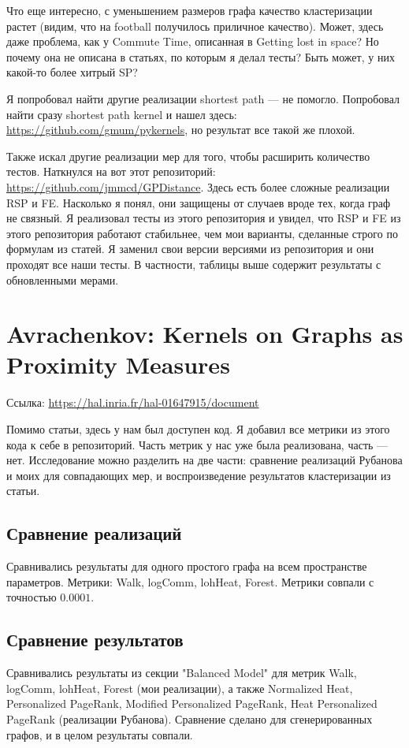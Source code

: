 \documentclass{article}
\begin{document}
 Что еще интересно, с уменьшением размеров графа качество кластеризации растет (видим, что на football получилось приличное качество). Может, здесь даже проблема, как у Commute Time, описанная в Getting lost in space? Но почему она не описана в статьях, по которым я делал тесты? Быть может, у них какой-то более хитрый SP?

Я попробовал найти другие реализации shortest path --- не помогло. Попробовал найти сразу shortest path kernel и нашел здесь: \url{https://github.com/gmum/pykernels}, но результат все такой же плохой.

Также искал другие реализации мер для того, чтобы расширить количество тестов. Наткнулся на вот этот репозиторий: \url{https://github.com/jmmcd/GPDistance}. Здесь есть более сложные реализации RSP и FE. Насколько я понял, они защищены от случаев вроде тех, когда граф не связный. Я реализовал тесты из этого репозитория и увидел, что RSP и FE из этого репозитория работают стабильнее, чем мои варианты, сделанные строго по формулам из статей. Я заменил свои версии версиями из репозитория и они проходят все наши тесты. В частности, таблицы выше содержит результаты с обновленными мерами.


\section{Avrachenkov: Kernels on Graphs as Proximity Measures}
Ссылка: \url{https://hal.inria.fr/hal-01647915/document}

Помимо статьи, здесь у нам был доступен код. Я добавил все метрики из этого кода к себе в репозиторий. Часть метрик у нас уже была реализована, часть --- нет.
Исследование можно разделить на две части: сравнение реализаций Рубанова и моих для совпадающих мер, и воспроизведение результатов кластеризации из статьи.

\subsection{Сравнение реализаций}
Сравнивались результаты для одного простого графа на всем пространстве параметров. Метрики: Walk, logComm, lohHeat, Forest. Метрики совпали с точностью  $0.0001$.

\subsection{Сравнение результатов}
Сравнивались результаты из секции "Balanced Model" для метрик Walk, logComm, lohHeat, Forest (мои реализации), а также Normalized Heat, Personalized PageRank, Modified Personalized PageRank, Heat Personalized PageRank (реализации Рубанова). Сравнение сделано для сгенерированных графов, и в целом результаты совпали.
\end{document}
